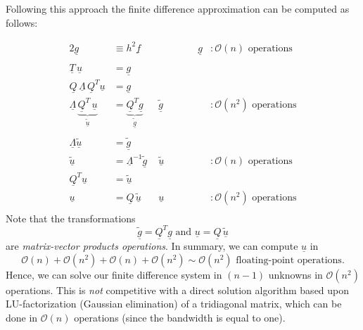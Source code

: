 \documentclass[11pt]{article}
\begin{document}
\newpage

Following this approach the finite difference approximation can be computed as follows:

\begin{alignat*}{2}
  \underline{g} &\equiv  h^2 \underline{f} \quad &  \qquad \qquad \underline{g} &: \mathcal{O}(n) \text{ operations} \\ \\
  \underline{T} \, \underline{u} &= \underline{g} \\
  \underline{Q} \, \underline{\Lambda} \, \underline{Q}^T \underline{u} &= \underline{g} \\
  \underline{\Lambda}\, \underset{\widetilde{\underline{u}}}{\underbrace{\underline{Q}^T\, \underline{u}}} &= \underset{\widetilde{\underline{g}}}{\underbrace{\underline{Q}^T \underline{g}}} & \widetilde{\underline{g}} &: \mathcal{O}(n^2) \text{ operations} \\ \\
  \underline{\Lambda} \widetilde{\underline{u}} &= \widetilde{\underline{g}} \\
  \widetilde{\underline{u}} &= \underline{\Lambda}^{-1} \widetilde{\underline{g}} & \widetilde{\underline{u}} &: \mathcal{O}(n) \text{ operations} \\
  \underline{Q}^T \underline{u} &= \widetilde{\underline{u}} \\
   \underline{u} &= \underline{Q} \, \widetilde{\underline{u}} & \underline{u} &: \mathcal{O}(n^2) \text{ operations} \\
\end{alignat*}
Note that the transformations
\begin{equation*}
  \widetilde{\underline{g}} = \underline{Q}^T \underline{g} \text{ and } \underline{u} = \underline{Q} \, \widetilde{\underline{u}}
\end{equation*}
are {\em matrix-vector products operations}.
In summary, we can compute $\underline{u}$ in
\begin{equation*}
  \mathcal{O}(n) + \mathcal{O}(n^2) + \mathcal{O}(n) + \mathcal{O}(n^2) \sim \mathcal{O}(n^2) \text{ floating-point operations}.
\end{equation*}
Hence, we can solve our finite difference system in $(n-1)$ unknowns in $\mathcal{O}(n^2)$ operations. This is {\em not} competitive with a direct solution algorithm based upon LU-factorization (Gaussian elimination) of a tridiagonal matrix, which can be done in $\mathcal{O}(n)$ operations (since the bandwidth is equal to one).\\
\end{document}
